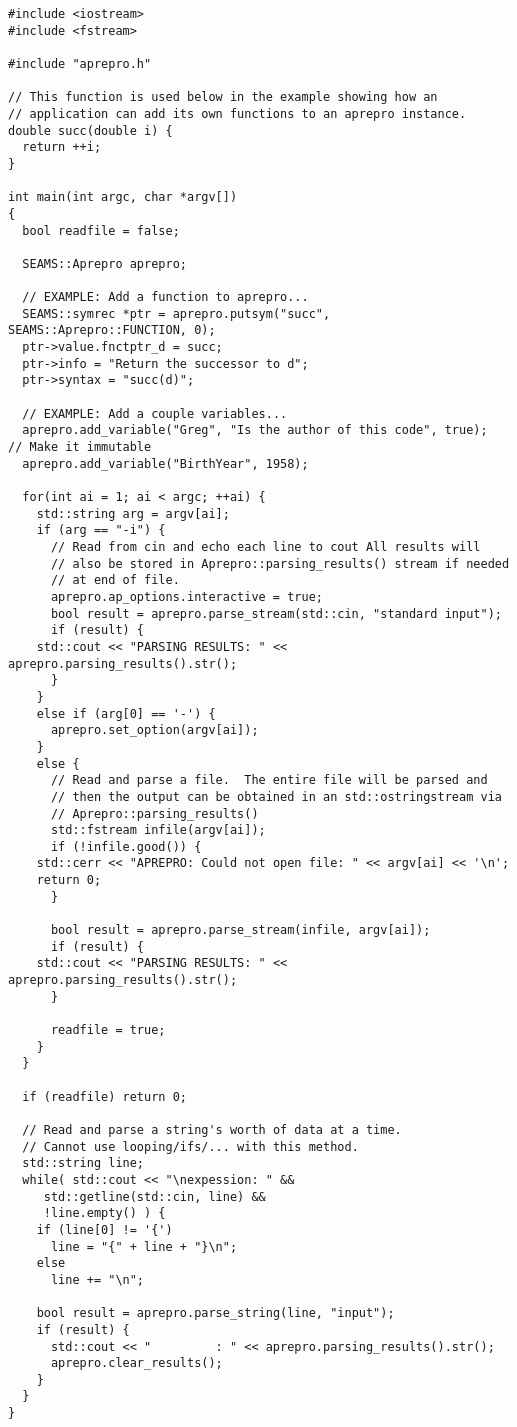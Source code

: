 \begin{lstlisting}
#include <iostream>
#include <fstream>

#include "aprepro.h"

// This function is used below in the example showing how an
// application can add its own functions to an aprepro instance.
double succ(double i) {
  return ++i;
}

int main(int argc, char *argv[])
{
  bool readfile = false;

  SEAMS::Aprepro aprepro;

  // EXAMPLE: Add a function to aprepro...
  SEAMS::symrec *ptr = aprepro.putsym("succ", SEAMS::Aprepro::FUNCTION, 0);
  ptr->value.fnctptr_d = succ;
  ptr->info = "Return the successor to d";
  ptr->syntax = "succ(d)";

  // EXAMPLE: Add a couple variables...
  aprepro.add_variable("Greg", "Is the author of this code", true);  // Make it immutable
  aprepro.add_variable("BirthYear", 1958);

  for(int ai = 1; ai < argc; ++ai) {
    std::string arg = argv[ai];
    if (arg == "-i") {
      // Read from cin and echo each line to cout All results will
      // also be stored in Aprepro::parsing_results() stream if needed
      // at end of file.
      aprepro.ap_options.interactive = true;
      bool result = aprepro.parse_stream(std::cin, "standard input");
      if (result) {
	std::cout << "PARSING RESULTS: " << aprepro.parsing_results().str();
      }
    }
    else if (arg[0] == '-') {
      aprepro.set_option(argv[ai]);
    }
    else {
      // Read and parse a file.  The entire file will be parsed and
      // then the output can be obtained in an std::ostringstream via
      // Aprepro::parsing_results()
      std::fstream infile(argv[ai]);
      if (!infile.good()) {
	std::cerr << "APREPRO: Could not open file: " << argv[ai] << '\n';
	return 0;
      }

      bool result = aprepro.parse_stream(infile, argv[ai]);
      if (result) {
	std::cout << "PARSING RESULTS: " << aprepro.parsing_results().str();
      }

      readfile = true;
    }
  }

  if (readfile) return 0;

  // Read and parse a string's worth of data at a time.
  // Cannot use looping/ifs/... with this method.
  std::string line;
  while( std::cout << "\nexpession: " &&
	 std::getline(std::cin, line) &&
	 !line.empty() ) {
    if (line[0] != '{')
      line = "{" + line + "}\n";
    else
      line += "\n";

    bool result = aprepro.parse_string(line, "input");
    if (result) {
      std::cout << "         : " << aprepro.parsing_results().str();
      aprepro.clear_results();
    }
  }
}
\end{lstlisting}
